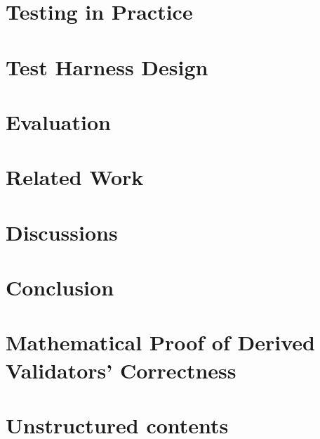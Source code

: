 \documentclass[12pt,oneside,reqno]{amsbook}
\theoremstyle{definition}
\numberwithin{section}{chapter}
\numberwithin{figure}{chapter}
\numberwithin{equation}{chapter}
\numberwithin{definition}{chapter}
\begin{document}
\chapter{Testing in Practice}
\label{chap:practices}


\chapter{Test Harness Design}
\label{chap:harness}


\chapter{Evaluation}
\label{chap:eval}


\chapter{Related Work}
\label{chap:related-work}


\chapter{Discussions}
\label{chap:discussion}

\chapter{Conclusion}
\label{chap:conclusion}

\printbibliography

\appendix

\chapter{Mathematical Proof of Derived Validators' Correctness}
\label{chap:math-proof}


\chapter{Unstructured contents}

\end{document}
